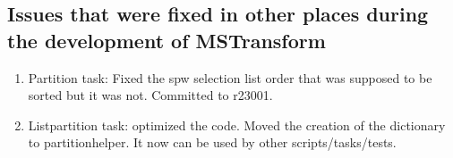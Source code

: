\subsection{Issues that were fixed in other places during the development of MSTransform}
\begin{enumerate}
\item Partition task: Fixed the spw selection list order that was supposed to be sorted but it was not.
Committed to r23001.
\item Listpartition task: optimized the code. Moved the creation of the dictionary to partitionhelper. It
now can be used by other scripts/tasks/tests.
\end{enumerate}

